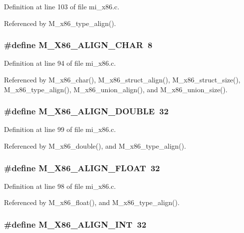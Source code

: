 Definition at line 103 of file mi\_\-x86.c.

Referenced by M\_\-x86\_\-type\_\-align().
\subsubsection{\setlength{\rightskip}{0pt plus 5cm}\#define M\_\-X86\_\-ALIGN\_\-CHAR~8}\label{mi__x86_8c_11b2ed1f8419865b52dd3bf9e1025a48}




Definition at line 94 of file mi\_\-x86.c.

Referenced by M\_\-x86\_\-char(), M\_\-x86\_\-struct\_\-align(), M\_\-x86\_\-struct\_\-size(), M\_\-x86\_\-type\_\-align(), M\_\-x86\_\-union\_\-align(), and M\_\-x86\_\-union\_\-size().
\subsubsection{\setlength{\rightskip}{0pt plus 5cm}\#define M\_\-X86\_\-ALIGN\_\-DOUBLE~32}\label{mi__x86_8c_be4ce7a7035eea2dab73cf7afd7d3be9}




Definition at line 99 of file mi\_\-x86.c.

Referenced by M\_\-x86\_\-double(), and M\_\-x86\_\-type\_\-align().
\subsubsection{\setlength{\rightskip}{0pt plus 5cm}\#define M\_\-X86\_\-ALIGN\_\-FLOAT~32}\label{mi__x86_8c_37167e2f19b6eacd5fb02de1f49606bc}




Definition at line 98 of file mi\_\-x86.c.

Referenced by M\_\-x86\_\-float(), and M\_\-x86\_\-type\_\-align().
\subsubsection{\setlength{\rightskip}{0pt plus 5cm}\#define M\_\-X86\_\-ALIGN\_\-INT~32}\label{mi__x86_8c_579f15194b59a2cf54990855ef1d8cfe}




